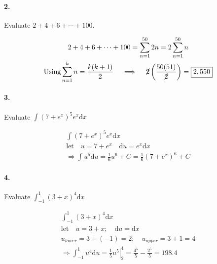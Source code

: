     \paragraph*{2.}
    Evaluate $2+4+6+\cdots+100$.

    \begin{mdframed}
        \begin{equation*}
            \begin{gathered}
                2+4+6+\cdots+100 = \sum_{n=1}^{50}2n = 2\sum_{n=1}^{50}n    \\
                \text{Using} \sum_{n=1}^{k}n = \frac{k(k+1)}{2} \quad \implies \quad \cancel{2}\left(\frac{50(51)}{\cancel{2}}\right) = \boxed{2,550}
            \end{gathered}
        \end{equation*}
    \end{mdframed}

    \paragraph*{3.}
    Evaluate $\displaystyle\int(7+e^x)^5 e^x \mathrm{d}x$

    \begin{mdframed}
        \begin{equation*}
            \begin{gathered}
                \int(7+e^x)^5 e^x \mathrm{d}x                                   \\
                \text{let} \quad u = 7 + e^x \quad \mathrm{d}u = e^x\mathrm{d}x \\
                \Rightarrow\int u^5\mathrm{d}u = \frac{1}{6}u^6 + C = \boxed{\frac{1}{6}(7 + e^x)^6 + C}
            \end{gathered}
        \end{equation*}
    \end{mdframed}

    \paragraph*{4.}
    Evaluate $\displaystyle\int_{-1}^{1}(3+x)^4 \mathrm{d}x$

    \begin{mdframed}
        \begin{equation*}
            \begin{gathered}
                \int_{-1}^{1}(3+x)^4 \mathrm{d}x                                \\
                \text{let} \quad u = 3 + x; \quad \mathrm{d}u = \mathrm{d}x     \\
                u_{lower} = 3 + (-1) = 2; \quad u_{upper} = 3 + 1 = 4                  \\
                \Rightarrow\int_{-1}^{1}u^4 \mathrm{d}u = \left.\frac{1}{5}u^5 \right|_{2}^{4}= \frac{4^5}{5} - \frac{2^5}{5} = \boxed{198.4}
            \end{gathered}
        \end{equation*}
    \end{mdframed}
